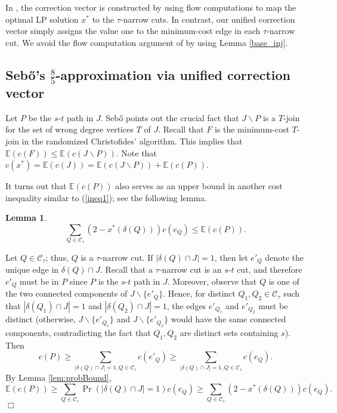 \documentclass[11pt]{article}
\newcommand{\qed}{\hspace*{\fill}$\Box$}
\newcommand{\bs}{\backslash}
\newtheorem{lemma}[theorem]{Lemma}
\newenvironment{proof}[1][Proof. ]{\noindent {\bf #1 }}{\qed}
\begin{document}
In \cite{AKS12}, the correction vector is constructed by using flow
computations to map the optimal LP solution $x^*$ to the $\tau$-narrow cuts. In contrast, our unified correction vector simply assigns the
value one to the minimum-cost edge in each $\tau$-narrow cut. We avoid the flow computation argument of \cite{AKS12} by using Lemma \ref{base_inj}.



\subsection{Seb\H{o}'s $\frac{8}{5}$-approximation via
unified correction vector}\label{sec:sebo's results}

Let $P$ be the $s$-$t$ path in $J$.
Seb\H{o} \cite{sebo13} points out the crucial fact that
$J\backslash P$ is a $T$-join for the set of wrong degree vertices $T$ of $J$. Recall that $F$ is the
minimum-cost $T$-join in the randomized Christofides' algorithm. This implies that $\mathbb{E}(c(F))\leq \mathbb{E}(c(J\backslash P))$.
Note that $c(x^*)=\mathbb{E}(c(J))=
\mathbb{E}(c(J\backslash P))+\mathbb{E}(c(P))$.

It turns out that $\mathbb{E}(c(P))$ also serves as
an upper bound in another cost inequality similar to (\ref{ineq1});
see the following lemma.

\begin{lemma}\label{lem:ineq2}
\begin{equation}\label{ineq2}
\sum_{Q\in \mathcal{C}_\tau} (2-x^*(\delta(Q)))c(e_Q) \leq \mathbb{E}(c(P)).
\end{equation}
\end{lemma}
\begin{proof}
Let $Q\in \mathcal{C}_\tau$; thus, $Q$ is a $\tau$-narrow cut.
If $|\delta(Q)\cap J|=1$,
then let $e'_Q$ denote the unique edge in $\delta(Q)\cap J$.
Recall that a $\tau$-narrow cut is an $s$-$t$ cut, and therefore
$e'_Q$ must be in $P$ since $P$ is the $s$-$t$ path in $J$.
Moreover, observe that $Q$ is one of the two connected components of
$J\bs\{e'_Q\}$.
Hence, for distinct $Q_1, Q_2 \in \mathcal{C}_\tau$
such that $|\delta(Q_1)\cap J|=1$ and $|\delta(Q_2)\cap J|=1$,
the edges $e'_{Q_1}$ and $e'_{Q_2}$ must be distinct
(otherwise, $J\bs\{e'_{Q_1}\}$ and $J\bs\{e'_{Q_2}\}$ would have
the same connected components, contradicting the fact that $Q_1,Q_2$
are distinct sets containing $s$).
Then
\[c(P)\geq \sum_{|\delta(Q)\cap J|=1, Q\in \mathcal{C}_\tau}c(e'_Q)\geq
\sum_{|\delta(Q)\cap J|=1, Q\in \mathcal{C}_\tau}c(e_Q).\]
By Lemma  \ref{lem:probBound},
\[\mathbb{E} (c(P)) \geq
\sum_{Q\in \mathcal{C}_\tau}\Pr( |\delta(Q)\cap J|=1) c(e_Q) \geq
\sum_{Q\in \mathcal{C}_\tau} (2-x^*(\delta(Q)))c(e_Q).\]
\end{proof}
\end{document}
